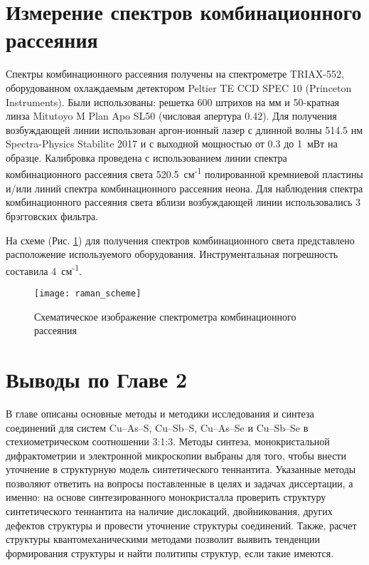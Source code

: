 \newpage
\section{Измерение спектров комбинационного рассеяния} \label{sect2_6}

Спектры комбинационного рассеяния получены на спектрометре TRIAX-552, оборудованном охлаждаемым детектором Peltier TE CCD SPEC 10 (Princeton Instruments).
Были использованы: решетка 600 штрихов на мм и 50-кратная линза Mitutoyo M Plan Apo SL50 (числовая апертура 0.42).
Для получения возбуждающей линии использован аргон-ионный лазер с длинной волны 514.5 нм Spectra-Physics Stabilite 2017 и с выходной мощностью от 0.3 до 1~мВт на образце. Калибровка проведена с использованием линии спектра комбинационного рассеяния света 520.5~см\textsuperscript{-1} полированной кремниевой пластины и/или линий спектра комбинационного рассеяния неона.
Для наблюдения спектра комбинационного рассеяния света вблизи возбуждающей линии использовались 3  брэгговских фильтра.

На схеме (Рис. \ref{img:raman}) для получения спектров комбинационного света представлено расположение используемого оборудования. Инструментальная погрешность составила 4~см\textsuperscript{-1}.
\begin{figure}[p!]
  \begin{minipage}[ht]{0.99\linewidth}\centering
    \texttt{[image: raman\_scheme]}
  \end{minipage}


      \caption[Схематическое изображение спектрометра комбинационного рассеяния]{Схематическое изображение спектрометра комбинационного рассеяния}
    \label{img:raman}
\end{figure}
\newpage

\section{Выводы по Главе 2} \label{sect2_7}

В главе описаны основные методы и методики исследования и синтеза соединений для систем Cu--As--S, Cu--Sb--S, Cu--As--Se и Cu--Sb--Se в стехиометрическом соотношении 3:1:3.
Методы синтеза, монокристальной дифрактометрии и электронной микроскопии выбраны для того, чтобы внести уточнение в структурную модель синтетического теннантита. Указанные методы позволяют ответить на вопросы поставленные в целях и задачах диссертации, а именно: на основе синтезированного монокристалла проверить структуру синтетического теннантита на наличие дислокаций, двойникования, других дефектов структуры и провести уточнение структуры соединений. Также, расчет структуры квантомеханическими методами позволит выявить тенденции формирования структуры и найти политипы структур, если такие имеются.

